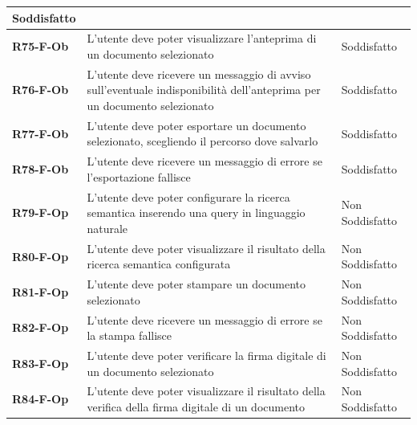 \documentclass[a4paper,12pt]{article}
\begin{document}
{{{\begin{longtable}{|>{\centering\arraybackslash}m{}|>{\centering\arraybackslash}m{}|>{\centering\arraybackslash}m{}|}
                Soddisfatto \\ 
                \hline
                \textbf{R75-F-Ob} & L'utente deve poter visualizzare l'anteprima di un documento selezionato & 
                Soddisfatto \\ 
                \hline
                \textbf{R76-F-Ob} & L'utente deve ricevere un messaggio di avviso sull'eventuale indisponibilità dell'anteprima per un documento selezionato & 
                Soddisfatto \\ 
                \hline
                \textbf{R77-F-Ob} & L'utente deve poter esportare un documento selezionato, scegliendo il percorso dove salvarlo & 
                Soddisfatto \\ 
                \hline
                \textbf{R78-F-Ob} & L'utente deve ricevere un messaggio di errore se l'esportazione fallisce & 
                Soddisfatto \\ 
                \hline
                \textbf{R79-F-Op} & L'utente deve poter configurare la ricerca semantica inserendo una query in linguaggio naturale & 
                Non Soddisfatto \\ 
                \hline
                \textbf{R80-F-Op} & L'utente deve poter visualizzare il risultato della ricerca semantica configurata & 
                Non Soddisfatto \\ 
                \hline
                \textbf{R81-F-Op} & L'utente deve poter stampare un documento selezionato & 
                Non Soddisfatto \\ 
                \hline
                \textbf{R82-F-Op} & L'utente deve ricevere un messaggio di errore se la stampa fallisce & 
                Non Soddisfatto \\ 
                \hline
                \textbf{R83-F-Op} & L'utente deve poter verificare la firma digitale di un documento selezionato & 
                Non Soddisfatto \\ 
                \hline
                \textbf{R84-F-Op} & L'utente deve poter visualizzare il risultato della verifica della firma digitale di un documento & 
                Non Soddisfatto \\ 
                \hline
            \end{longtable}
        }
}}
\end{document}

